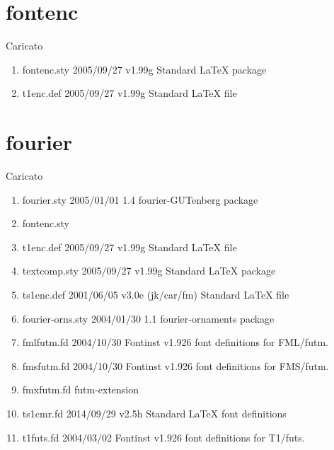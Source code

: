 \section{fontenc}

Caricato 
\begin{enumerate}
\item fontenc.sty 2005/09/27 v1.99g Standard LaTeX package
\item t1enc.def 2005/09/27 v1.99g Standard LaTeX file
\end{enumerate}
\section{fourier}

Caricato 
\begin{enumerate}
\item 	fourier.sty 2005/01/01 1.4 fourier-GUTenberg package
\item 	fontenc.sty
\item 	t1enc.def 2005/09/27 v1.99g Standard LaTeX file
\item 	textcomp.sty 2005/09/27 v1.99g Standard LaTeX package
\item 	ts1enc.def 2001/06/05 v3.0e (jk/car/fm) Standard LaTeX file
\item 	fourier-orns.sty 2004/01/30 1.1 fourier-ornaments package
\item 	fmlfutm.fd 2004/10/30 Fontinst v1.926 font definitions for FML/futm.
\item 	fmsfutm.fd 2004/10/30 Fontinst v1.926 font definitions for FMS/futm.
\item 	fmxfutm.fd futm-extension
\item 	ts1cmr.fd 2014/09/29 v2.5h Standard LaTeX font definitions
\item 	t1futs.fd 2004/03/02 Fontinst v1.926 font definitions for T1/futs.
\end{enumerate}	
